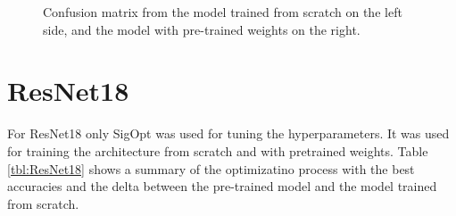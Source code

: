 \begin{figure}[h]
\centering
{}
\caption{Confusion matrix from the model trained from scratch on the left side, and the model with pre-trained weights on the right.}
\label{fig:alexnet-cm}
\end{figure}
















\section{ResNet18}

For ResNet18 only SigOpt was used for tuning the hyperparameters. It was used for training the architecture from scratch and with pretrained weights. Table \ref{tbl:ResNet18} shows a summary of the optimizatino process with the best accuracies and the delta between the pre-trained model and the model trained from scratch.

